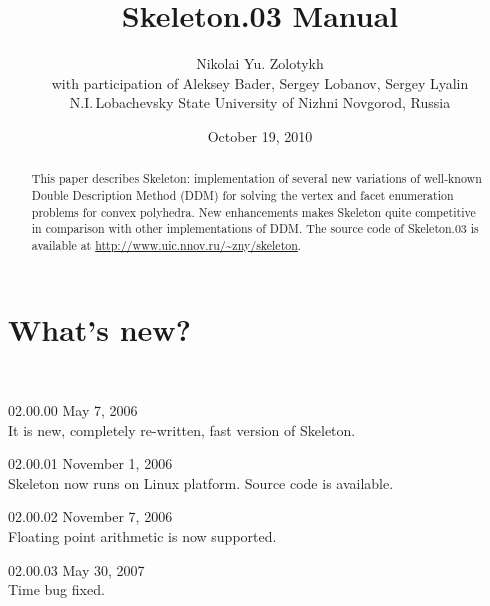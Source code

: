 \documentclass{article}
\newcommand{\Skeleton}{{\sc Skeleton}\xspace}
\newcommand{\SkeletonVersion}{{\sc 02.01.03}\xspace}
\newcommand{\SkeletonDate}{October 19, 2010}
\newcommand{\params}{\smallskip\hangindent=2\parindent}
\newcommand{\transpose}{^{\top}}
\begin{document}
\title{\Skeleton \SkeletonVersion Manual}

\date{\SkeletonDate}

\author{Nikolai Yu. Zolotykh\\[0.5em]
\small with participation of Aleksey Bader, Sergey Lobanov, Sergey Lyalin\\[1em]
 N.I.\,Lobachevsky State University of Nizhni Novgorod, Russia}

\maketitle

\begin{abstract}
This paper describes \Skeleton: implementation of several new variations of
well-known Double Description Method (DDM) for solving the vertex and facet
enumeration problems for convex polyhedra. New enhancements makes \Skeleton 
quite competitive in comparison with other implementations of DDM.
The source code of \Skeleton \SkeletonVersion is available at
\url{http://www.uic.nnov.ru/~zny/skeleton}.
\end{abstract}

\tableofcontents

\newpage

\newcommand{\AB}{(A\transpose,B\transpose)}%

\section{What's new?}
\ 

\params \Skeleton 02.00.00 May 7, 2006\\ It is new, completely re-written, fast version of \Skeleton.

\params \Skeleton 02.00.01 November 1, 2006\\
\Skeleton now runs on Linux platform. Source code is available.

\params \Skeleton 02.00.02 November 7, 2006\\
Floating point arithmetic is now supported.

\params \Skeleton 02.00.03 May 30, 2007\\
Time bug fixed.
\end{document}
